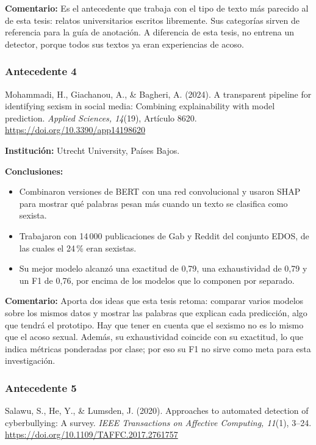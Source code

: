 \noindent\textbf{Comentario:} Es el antecedente que trabaja con el tipo de texto más parecido al de esta tesis: relatos universitarios escritos libremente. Sus categorías sirven de referencia para la guía de anotación. A diferencia de esta tesis, no entrena un detector, porque todos sus textos ya eran experiencias de acoso.

\subsubsection{Antecedente 4}
\noindent Mohammadi, H., Giachanou, A., \& Bagheri, A. (2024). A transparent pipeline for identifying sexism in social media: Combining explainability with model prediction. \textit{Applied Sciences, 14}(19), Artículo 8620. \url{https://doi.org/10.3390/app14198620}

\noindent\textbf{Institución:} Utrecht University, Países Bajos.

\noindent\textbf{Conclusiones:}
\begin{itemize}
	\item Combinaron versiones de BERT con una red convolucional y usaron SHAP para mostrar qué palabras pesan más cuando un texto se clasifica como sexista.
	\item Trabajaron con 14\,000 publicaciones de Gab y Reddit del conjunto EDOS, de las cuales el 24\,\% eran sexistas.
	\item Su mejor modelo alcanzó una exactitud de 0,79, una exhaustividad de 0,79 y un F1 de 0,76, por encima de los modelos que lo componen por separado.
\end{itemize}

\noindent\textbf{Comentario:} Aporta dos ideas que esta tesis retoma: comparar varios modelos sobre los mismos datos y mostrar las palabras que explican cada predicción, algo que tendrá el prototipo. Hay que tener en cuenta que el sexismo no es lo mismo que el acoso sexual. Además, su exhaustividad coincide con su exactitud, lo que indica métricas ponderadas por clase; por eso su F1 no sirve como meta para esta investigación.

\subsubsection{Antecedente 5}
\noindent Salawu, S., He, Y., \& Lumsden, J. (2020). Approaches to automated detection of cyberbullying: A survey. \textit{IEEE Transactions on Affective Computing, 11}(1), 3--24. \url{https://doi.org/10.1109/TAFFC.2017.2761757}

